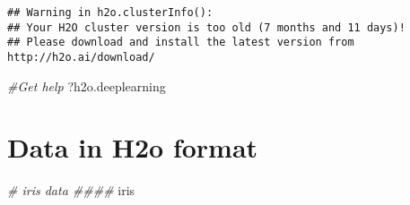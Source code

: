 \documentclass[
]{book}
\newenvironment{Shaded}{\begin{snugshade}}{\end{snugshade}}
\newcommand{\CommentTok}[1]{\textcolor[rgb]{0.56,0.35,0.01}{\textit{#1}}}
\newcommand{\NormalTok}[1]{#1}
\begin{document}
\begin{verbatim}
## Warning in h2o.clusterInfo(): 
## Your H2O cluster version is too old (7 months and 11 days)!
## Please download and install the latest version from http://h2o.ai/download/
\end{verbatim}

\begin{Shaded}
\begin{Highlighting}[]
\CommentTok{#Get help}
\NormalTok{?h2o.deeplearning}
\end{Highlighting}
\end{Shaded}

\hypertarget{data-in-h2o-format}{%
\section{Data in H2o format}\label{data-in-h2o-format}}

\begin{Shaded}
\begin{Highlighting}[]
\CommentTok{# iris data ####}
\NormalTok{iris}
\end{Highlighting}
\end{Shaded}
\end{document}
